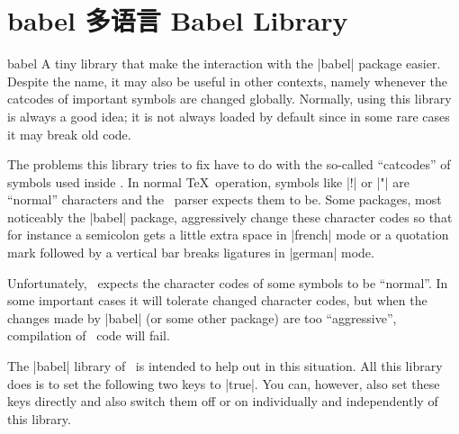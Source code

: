 %
%
%


\section{babel 多语言 Babel Library}
\label{section-library-babel}

\begin{tikzlibrary}{babel}
    A tiny library that make the interaction with the |babel| package easier.
    Despite the name, it may also be useful in other contexts, namely whenever
    the catcodes of important symbols are changed globally. Normally, using
    this library is always a good idea; it is not always loaded by default
    since in some rare cases it may break old code.
\end{tikzlibrary}

The problems this library tries to fix have to do with the so-called
``catcodes'' of symbols used inside \tikzname. In normal \TeX\ operation,
symbols like |!| or |"| are ``normal'' characters and the \tikzname\ parser
expects them to be. Some packages, most noticeably the |babel| package,
aggressively change these character codes so that for instance a semicolon gets
a little extra space in |french| mode or a quotation mark followed by a
vertical bar breaks ligatures in |german| mode.

Unfortunately, \tikzname\ expects the character codes of some symbols to be
``normal''. In some important cases it will tolerate changed character codes,
but when the changes made by |babel| (or some other package) are too
``aggressive'', compilation of \tikzname\ code will fail.

The |babel| library of \tikzname\ is intended to help out in this situation.
All this library does is to set the following two keys to |true|. You can,
however, also set these keys directly and also switch them off or on
individually and independently of this library.

